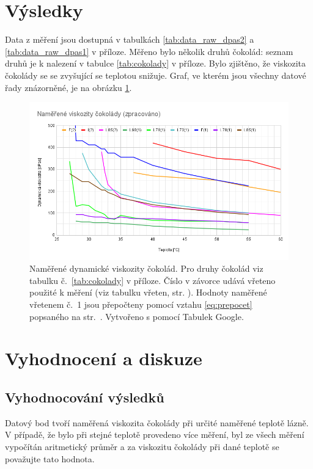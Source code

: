 \documentclass[12pt]{article}
\begin{document}
\newpage
\section{Výsledky}

Data z měření jsou dostupná v tabulkách \ref{tab:data_raw_dpas2} a \ref{tab:data_raw_dpas1} v příloze. Měřeno bylo několik druhů čokolád: seznam druhů je k nalezení v tabulce \ref{tab:cokolady} v příloze. Bylo zjištěno, že viskozita čokolády se se zvyšující se teplotou snižuje. Graf, ve kterém jsou všechny datové řady znázorněné, je na obrázku \ref{fig:data_zprac}.
\begin{figure}[h!]
    \centering
    \includegraphics[width = \linewidth]{figures/data_zpracovano.png}
    \caption{Naměřené dynamické viskozity čokolád. Pro druhy čokolád viz tabulku č.~\ref{tab:cokolady} v příloze. Číslo v závorce udává vřeteno použité k měření (viz tabulku vřeten, str. \pageref{tab:vretena}). Hodnoty naměřené vřetenem č.~1 jsou přepočteny pomocí vztahu \ref{eq:prepocet} popsaného na str.~\pageref{eq:prepocet}. Vytvořeno s pomocí Tabulek Google.}
    \label{fig:data_zprac}
\end{figure}


\newpage
\section{Vyhodnocení a diskuze}
\subsection{Vyhodnocování výsledků}
Datový bod tvoří naměřená viskozita čokolády při určité naměřené teplotě lázně. V případě, že bylo při stejné teplotě provedeno více měření, byl ze všech měření vypočítán aritmetický průměr a za viskozitu čokolády při dané teplotě se považujte tato hodnota.
\end{document}
